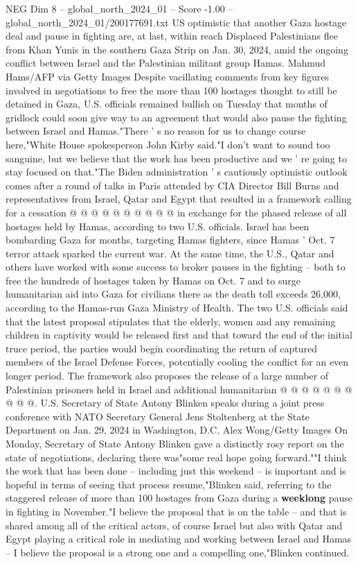 \begin{textsample}{NEG Dim 8 – global\_north\_2024\_01 – Score -1.00 – global\_north\_2024\_01/200177691.txt}  \label{ex:f8_neg_211}
US optimistic that another Gaza hostage deal and pause in fighting are, at last, within reach Displaced Palestinians flee from Khan Yunis in the southern Gaza Strip on Jan. 30, 2024, amid the ongoing conflict between Israel and the Palestinian militant group Hamas.
Mahmud Hams/AFP via Getty Images Despite vacillating comments from key figures involved in negotiations to free the more than 100 hostages thought to still be detained in Gaza, U.S. officials remained bullish on Tuesday that months of gridlock could soon give way to an agreement that would also pause the fighting between Israel and Hamas."There ' s no reason for us to change course here,"White House spokesperson John Kirby said."I don't want to sound too sanguine, but we believe that the work has been productive and we ' re going to stay focused on that."The Biden administration ' s cautiously optimistic outlook comes after a round of talks in Paris attended by CIA Director Bill Burns and representatives from Israel, Qatar and Egypt that resulted in a framework calling for a cessation @ @ @ @ @ @ @ @ @ @ in exchange for the phased release of all hostages held by Hamas, according to two U.S. officials.
Israel has been bombarding Gaza for months, targeting Hamas fighters, since Hamas ' Oct. 7 terror attack sparked the current war.
At the same time, the U.S., Qatar and others have worked with some success to broker pauses in the fighting -- both to free the hundreds of hostages taken by Hamas on Oct. 7 and to surge humanitarian aid into Gaza for civilians there as the death toll exceeds 26,000, according to the Hamas-run Gaza Ministry of Health.
The two U.S. officials said that the latest proposal stipulates that the elderly, women and any remaining children in captivity would be released first and that toward the end of the initial truce period, the parties would begin coordinating the return of captured members of the Israel Defense Forces, potentially cooling the conflict for an even longer period.
The framework also proposes the release of a large number of Palestinian prisoners held in Israel and additional humanitarian @ @ @ @ @ @ @ @ @ @.
U.S.
Secretary of State Antony Blinken speaks during a joint press conference with NATO Secretary General Jens Stoltenberg at the State Department on Jan. 29, 2024 in Washington, D.C.
Alex Wong/Getty Images On Monday, Secretary of State Antony Blinken gave a distinctly rosy report on the state of negotiations, declaring there was"some real hope going forward.""I think the work that has been done -- including just this weekend -- is important and is hopeful in terms of seeing that process resume,"Blinken said, referring to the staggered release of more than 100 hostages from Gaza during a \textbf{weeklong} pause in fighting in November."I believe the proposal that is on the table -- and that is shared among all of the critical actors, of course Israel but also with Qatar and Egypt playing a critical role in mediating and working between Israel and Hamas -- I believe the proposal is a strong one and a compelling one,"Blinken continued.

\end{textsample}
